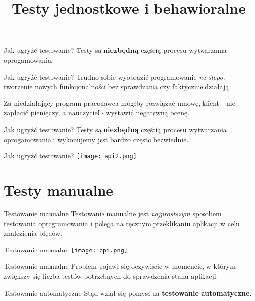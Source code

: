 

\title{Testy jednostkowe i behawioralne}



\begin{frame}{Jak ugryźć testowanie?}
	Testy są \textbf{niezbędną} częścią procesu wytwarzania oprogamowania.
\end{frame}

\begin{frame}{Jak ugryźć testowanie?}
	Trudno sobie wyobrazić programowanie \emph{na ślepo}: tworzenie nowych funkcjonalności bez sprawdzania czy faktycznie działają.
	
	Za niedziałający program pracodawca mógłby rozwiązać umowę, klient - nie zapłacić pieniędzy, a nauczyciel - wystawić negatywną ocenę.
\end{frame}

\begin{frame}{Jak ugryźć testowanie?}
	Testy są \textbf{niezbędną} częścią procesu wytwarzania oprogamowania i wykonujemy jest bardzo często bezwiednie.
\end{frame}

\begin{frame}{Jak ugryźć testowanie?}
	\centering
	\texttt{[image: api2.png]}
\end{frame}

\section{Testy manualne}

\begin{frame}{Testowanie manualne}
	Testowanie manualne jest \emph{najprostszym} sposobem testowania oprogramowania i polega na ręcznym przeklikaniu aplikacji w celu znalezienia błędów.
\end{frame}

\begin{frame}{Testowanie manualne}
	\centering
	\texttt{[image: api.png]}
\end{frame}

\begin{frame}{Testowanie manualne}
	Problem pojawi się oczywiście w momencie, w którym zwiększy się liczba testów potrzebnych do sprawdzenia stanu aplikacji.
\end{frame}

\begin{frame}{Testowanie automatyczne}
	Stąd wziął się pomysł na \textbf{testowanie automatyczne}.
\end{frame}

